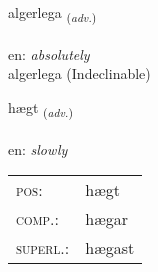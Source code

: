 \documentclass[frontgrid, backgrid]{flacards}\usepackage[]{graphicx}\usepackage[]{color}
\begin{document}

\renewcommand{\flhead}{\vskip5pt \fboxsep=0pt {\small\bfseries\footnotesize Atviksorð | Adverb}}
\renewcommand{\fcfoot}{\vskip5pt \fboxsep=0pt \hspace{2pt}{\small\bfseries\footnotesize 2K}}

\renewcommand{\blhead}{\vskip5pt {\small\bfseries\footnotesize Atviksorð | Adverb }}
\renewcommand{\bcfoot}{\vskip5pt \hspace{2pt}{\small\bfseries\footnotesize 2K}}


{algerlega \small{\textsubscript{(\textit{adv.})}} \\[1ex]
\textphonetic{[alcɛrlɛɣa]} \\
en: \emph{absolutely} \\  [2ex]
algerlega (Indeclinable)}

\renewcommand{\flhead}{\vskip5pt \fboxsep=0pt {\small\bfseries\footnotesize Atviksorð | Adverb}}
\renewcommand{\fcfoot}{\vskip5pt \fboxsep=0pt \hspace{2pt}{\small\bfseries\footnotesize 2K}}

\renewcommand{\blhead}{\vskip5pt {\small\bfseries\footnotesize Atviksorð | Adverb }}
\renewcommand{\bcfoot}{\vskip5pt \hspace{2pt}{\small\bfseries\footnotesize 2K}}


{hægt \small{\textsubscript{(\textit{adv.})}} \\[1ex] %
\textphonetic{[haixt]} \\
en: \emph{slowly} \\  [2ex]
\renewcommand*{\arraystretch}{0.8}
\begin{tabular}{ll}
\textsc{pos}: & hægt \\ 
\textsc{comp.}: & hægar \\ 
\textsc{superl.}: & hægast \\
\end{tabular}
}

\renewcommand{\flhead}{\vskip5pt \fboxsep=0pt {\small\bfseries\footnotesize Nafnorð | Noun}}
\renewcommand{\fcfoot}{\vskip5pt \fboxsep=0pt \hspace{2pt}{\small\bfseries\footnotesize 2K}}
\end{document}

